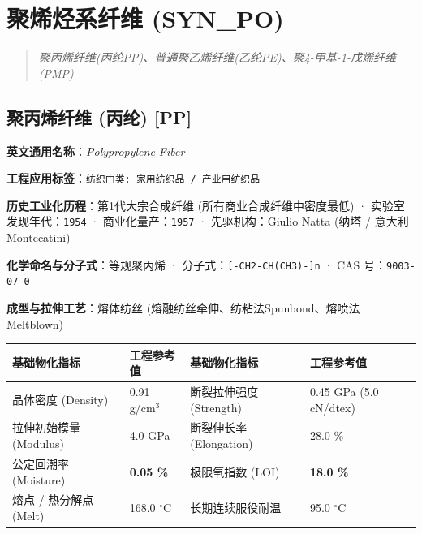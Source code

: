 \documentclass[11pt,openright,twoside,UTF8]{ctexbook}
\begin{document}
\chapter{聚烯烃系纤维 (SYN\_PO)}
\begin{quote}
\small\itshape
聚丙烯纤维(丙纶PP)、普通聚乙烯纤维(乙纶PE)、聚4-甲基-1-戊烯纤维(PMP)
\end{quote}

\section{聚丙烯纤维 (丙纶) [PP]}
\label{sec:pp}

\noindent\textbf{英文通用名称}：\textit{Polypropylene Fiber}\par
\noindent\textbf{工程应用标签}：\texttt{纺织门类: 家用纺织品 / 产业用纺织品}\par
\noindent\textbf{历史工业化历程}：第1代大宗合成纤维 (所有商业合成纤维中密度最低) · 实验室发现年代：\texttt{1954} · 商业化量产：\texttt{1957} · 先驱机构：Giulio Natta (纳塔 / 意大利 Montecatini)\par
\noindent\textbf{化学命名与分子式}：等规聚丙烯 · 分子式：\texttt{[-CH2-CH(CH3)-]n} · CAS 号：\texttt{9003-07-0}\par
\noindent\textbf{成型与拉伸工艺}：熔体纺丝 (熔融纺丝牵伸、纺粘法Spunbond、熔喷法Meltblown)\par

\vspace{0.15cm}
\begin{center}
\small
\begin{tabularx}{\textwidth}{p{3.8cm}Xp{3.8cm}X}
\toprule
\textbf{基础物化指标} & \textbf{工程参考值} & \textbf{基础物化指标} & \textbf{工程参考值} \\
\midrule
晶体密度 (Density) & 0.91 g/cm$^3$ & 断裂拉伸强度 (Strength) & 0.45 GPa (5.0 cN/dtex) \\
拉伸初始模量 (Modulus) & 4.0 GPa & 断裂伸长率 (Elongation) & 28.0 \% \\
公定回潮率 (Moisture) & \textbf{0.05 \%} & 极限氧指数 (LOI) & \textbf{18.0 \%} \\
熔点 / 热分解点 (Melt) & 168.0 $^\circ\mathrm{C}$ & 长期连续服役耐温 & 95.0 $^\circ\mathrm{C}$ \\
\bottomrule
\end{tabularx}
\end{center}
\vspace{0.15cm}
\end{document}
